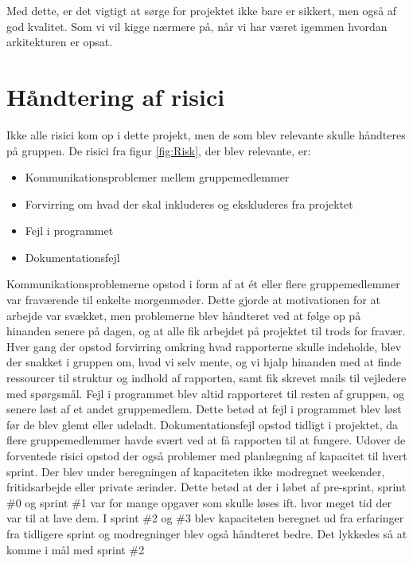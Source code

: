 Med dette, er det vigtigt at sørge for projektet ikke bare er sikkert, men også af god kvalitet. Som vi vil kigge nærmere på, når vi har været igemmen hvordan arkitekturen er opsat. 


\section{Håndtering af risici}\label{sec:handling_risks}
Ikke alle risici kom op i dette projekt, men de som blev relevante skulle håndteres på gruppen. De risici fra figur \ref{fig:Risk}, der blev relevante, er:
\begin{itemize}
    \item Kommunikationsproblemer mellem gruppemedlemmer
    \item Forvirring om hvad der skal inkluderes og ekskluderes fra projektet
    \item Fejl i programmet
    \item Dokumentationsfejl
\end{itemize}

Kommunikationsproblemerne opstod i form af at ét eller flere gruppemedlemmer var fraværende til enkelte morgenmøder. Dette gjorde at motivationen for at arbejde var svækket, men problemerne blev håndteret ved at følge op på hinanden senere på dagen, og at alle fik arbejdet på projektet til trods for fravær. 
Hver gang der opstod forvirring omkring hvad rapporterne skulle indeholde, blev der snakket i gruppen om, hvad vi selv mente, og vi hjalp hinanden med at finde ressourcer til struktur og indhold af rapporten, samt fik skrevet mails til vejledere med spørgsmål.
Fejl i programmet blev altid rapporteret til resten af gruppen, og senere løst af et andet gruppemedlem. Dette betød at fejl i programmet blev løst før de blev glemt eller udeladt. 
Dokumentationsfejl opstod tidligt i projektet, da flere gruppemedlemmer havde svært ved at få rapporten til at fungere. 
Udover de forventede risici opstod der også problemer med planlægning af kapacitet til hvert sprint. Der blev under beregningen af kapaciteten ikke modregnet weekender, fritidsarbejde eller private ærinder. Dette betød at der i løbet af pre-sprint, sprint \#0 og sprint \#1 var for mange opgaver som skulle løses ift. hvor meget tid der var til at lave dem. I sprint \#2 og \#3 blev kapaciteten beregnet ud fra erfaringer fra tidligere sprint og modregninger blev også håndteret bedre. Det lykkedes så at komme i mål med sprint \#2 %
